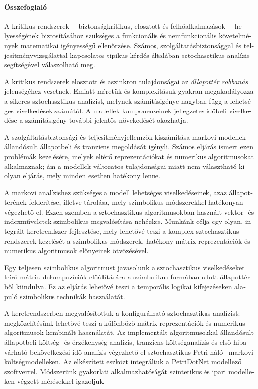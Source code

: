 \begin{otherlanguage}{magyar}

  \thispagestyle{plain}
  \paragraph*{Összefoglaló}

  A kritikus rendszerek --~biztonságkritikus,
  elosztott és felhőalkalmazások~-- helyességének
  biztosításához szükséges a funkcionális és nemfunkcionális
  követelmények matematikai igényességű ellenőrzése. Számos,
  szolgáltatásbiztonsággal és teljesítményvizsgálattal kapcsolatos
  tipikus kérdés általában sztochasztikus analízis segítségével
  válaszolható meg.

  A kritikus rendszerek elosztott és aszinkron tulajdonságai az
  \emph{állapottér robbanás} jelenségéhez vezetnek. Emiatt méretük és
  komplexitásuk gyakran megakadályozza a sikeres sztochasztikus
  analízist, melynek számításigénye nagyban függ a lehetséges
  viselkedések számától. A modellek komponenseinek jellegzetes időbeli
  viselkedése a számításigény további jelentős növekedését okozhatja.

  A szolgáltatásbiztonsági és teljesítményjellemzők kiszámítása
  markovi modellek állandósult állapotbeli és tranziens megoldását
  igényli. Számos eljárás ismert ezen problémák kezelésére, melyek
  eltérő reprezentációkat és numerikus algoritmusokat alkalmaznak; ám
  a modellek változatos tulajdonságai miatt nem választható ki olyan
  eljárás, mely minden esetben hatékony lenne.

  A markovi analízishez szükséges a modell lehetséges viselkedéseinek,
  azaz állapotterének felderítése, illetve tárolása, mely szimbolikus
  módszerekkel hatékonyan végezhető el. Ezzen szemben a sztochasztikus
  algoritmusokban használt vektor- és indexműveletek szimbolikus
  megvalósítása nehézkes. Munkánk célja egy olyan, integrált
  keretrendszer fejlesztése, mely lehetővé teszi a komplex
  sztochasztikus rendszerek kezelését a szimbolikus módszerek,
  hatékony mátrix reprezentációk és numerikus algoritmusok előnyeinek
  ötvözésével.

  Egy teljesen szimbolikus algoritmust javasolunk a sztochasztikus
  viselkedéseket leíró mátrix-dekompozíciók előállítására a
  szimbolikus formában adott állapottérből kiindulva. Ez az eljárás
  lehetővé teszi a temporális logikai kifejezéseken alapuló
  szimbolikus technikák használatát.

  A keretrendszerben megvalósítottuk a konfigurálható sztochasztikus
  analízist: megközelítésünk lehetővé teszi a különböző
  mátrix reprezentációk és numerikus algoritmusok kombinált
  használatát. Az implementált algoritmusokkal állandósult állapotbeli
  költség- és érzékenység analízis, tranziens költséganalízis és első
  hiba várható bekövetkezési idő analízis végezhető el sztochasztikus
  Petri-háló~ markovi költségmodelleken. Az
  elkészített eszközt integráltuk a PetriDotNet modellező
  szoftverrel. Módszerünk gyakorlati alkalmazhatóságát szintetikus és
  ipari modelleken végzett mérésekkel igazoljuk.

\end{otherlanguage}

